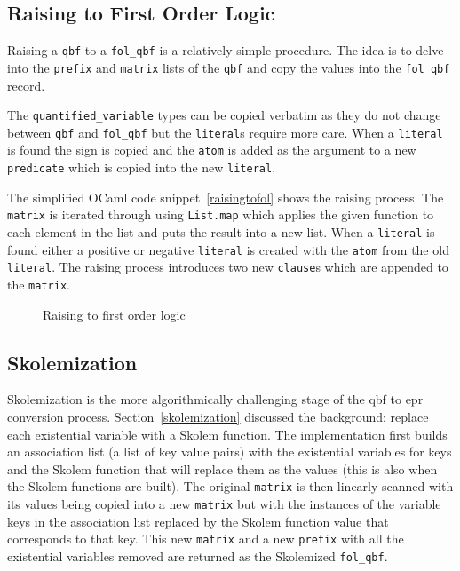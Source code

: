 \subsection{Raising to First Order Logic}
Raising a \texttt{qbf} to a \texttt{fol\_qbf} is a relatively simple procedure. The idea is to delve into the \texttt{prefix} and \texttt{matrix} lists of the \texttt{qbf} and copy the values into the \texttt{fol\_qbf} record.

The \texttt{quantified\_variable} types can be copied verbatim as they do not change between \texttt{qbf} and \texttt{fol\_qbf} but the \texttt{literal}s require more care. When a \texttt{literal} is found the sign is copied and the \texttt{atom} is added as the argument to a new \texttt{predicate} which is copied into the new \texttt{literal}.

The simplified OCaml code snippet~\ref{raisingtofol} shows the raising process. The \texttt{matrix} is iterated through using \texttt{List.map} which applies the given function to each element in the list and puts the result into a new list. When a \texttt{literal} is found either a positive or negative \texttt{literal} is created with the \texttt{atom} from the old \texttt{literal}. The raising process introduces two new \texttt{clause}s which are appended to the \texttt{matrix}.

\begin{figure}[H]
\caption{Raising to first order logic}
\begin{CenteredBox}

\end{CenteredBox}
\end{figure}

\subsection{Skolemization}
Skolemization is the more algorithmically challenging stage of the \gls{qbf} to \gls{epr} conversion process. Section~\ref{skolemization} discussed the background; replace each existential variable with a Skolem function. The implementation first builds an association list (a list of key value pairs) with the existential variables for keys and the Skolem function that will replace them as the values (this is also when the Skolem functions are built). The original \texttt{matrix} is then linearly scanned with its values being copied into a new \texttt{matrix} but with the instances of the variable keys in the association list replaced by the Skolem function value that corresponds to that key. This new \texttt{matrix} and a new \texttt{prefix} with all the existential variables removed are returned as the Skolemized \texttt{fol\_qbf}.

